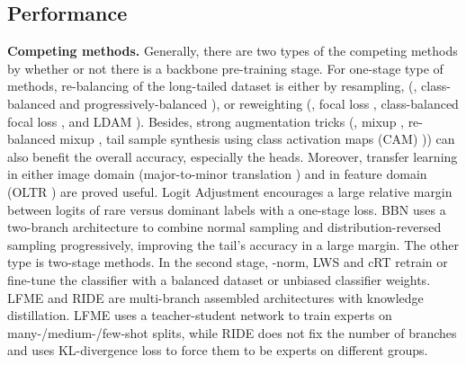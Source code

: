 \documentclass[10pt,twocolumn,letterpaper]{article}
\begin{document}
\subsection{Performance}
\textbf{Competing methods.} Generally, there are two types of the competing methods by whether or not there is a backbone pre-training stage. For one-stage type of methods, re-balancing of the long-tailed dataset is either by resampling, (\eg, class-balanced and progressively-balanced \cite{kang2019decoupling}), or reweighting (\eg, focal loss \cite{lin2017focal}, class-balanced focal loss \cite{cui2019class}, and LDAM \cite{cao2019learning}). Besides, strong augmentation tricks (\eg, mixup \cite{zhang2017mixup}, re-balanced mixup \cite{chou2020remix}, tail sample synthesis using class activation maps (CAM) \cite{zhang2021bag})) can also benefit the overall accuracy, especially the heads. Moreover, transfer learning in either image domain (major-to-minor translation \cite{kim2020m2m}) and in feature domain (OLTR \cite{liu2019large}) are proved useful. Logit Adjustment \cite{menon2020long} encourages a large relative margin between logits of rare
versus dominant labels with a one-stage loss. BBN \cite{zhou2020bbn} uses a two-branch architecture to combine normal sampling and distribution-reversed sampling progressively, improving the tail's accuracy in a large margin. The other type is two-stage methods. In the second stage, -norm, LWS and cRT \cite{kang2019decoupling} retrain or fine-tune the classifier with a balanced dataset or unbiased classifier weights. LFME \cite{xiang2020learning} and RIDE \cite{wang2020long} are multi-branch assembled architectures with knowledge distillation. LFME uses a teacher-student network to train experts on many-/medium-/few-shot splits, while RIDE does not fix the number of branches and uses KL-divergence loss to force them to be experts on different groups. \\ 
\end{document}
